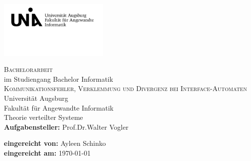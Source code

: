 \begin{titlepage}
\includegraphics[width=0.4\textwidth]{Uni_Aug_Logo_FAI_schwarz.png}
\vspace{-1cm}
\begin{center}
  \LARGE \textsc{Bachelorarbeit}\\
  \normalsize im Studiengang Bachelor Informatik\\
  \vfill
  \Huge \textsc{Kommunikationsfehler, Verklemmung und Divergenz bei
  Interface-Automaten}\\
  \vfill
  \Large Universität Augsburg\\
  Fakultät für Angewandte Informatik\\
  Theorie verteilter Systeme\\
  \vspace{2cm}
  \rmfamily \large \textbf{Aufgabensteller:} Prof.\;Dr.\;Walter Vogler
\end{center}
\vspace{1.5cm}
\large \textbf{eingereicht von:}
Ayleen Schinko\\
\textbf{eingereicht am:}
\today
\end{titlepage}
